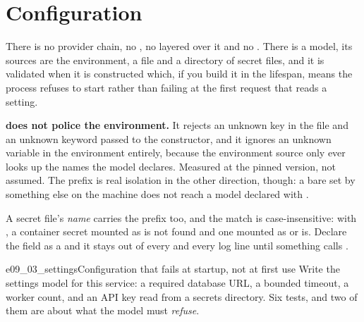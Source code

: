 \section{Configuration}
\label{sec:ch09-settings}


\noindent
There is no provider chain, no , no
 layered over it and no
. There is a model, its sources are the environment, a
 file and a directory of secret files, and it is validated when it
is constructed \dash{} which, if you build it in the lifespan, means the
process refuses to start rather than failing at the first request that reads
a setting.

\begin{trapbox}
\textbf{ does not police the environment.} It rejects an
unknown key in the  file and an unknown keyword passed to the
constructor, and it ignores an unknown  variable in the
environment entirely, because the environment source only ever looks up the
names the model declares. Measured at the pinned version, not assumed. The
prefix is real isolation in the other direction, though: a bare
 set by something else on the machine does not reach a
model declared with .
\end{trapbox}

\begin{note}
A secret file's \emph{name} carries the prefix too, and the match is
case-insensitive: with , a container secret
mounted as  is not found and one mounted as
 or  is. Declare the field as a
 and it stays out of every  and every log line
until something calls .
\end{note}

\begin{exercise}{e09_03_settings}{Configuration that fails at startup, not at first use}
Write the settings model for this service: a required database URL, a
bounded timeout, a worker count, and an API key read from a secrets
directory. Six tests, and two of them are about what the model must
\emph{refuse}.
\end{exercise}

